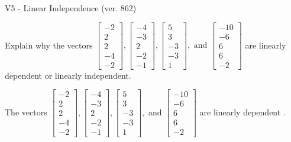 \begin{exercise}
  \begin{exerciseTitle}V5 - Linear Independence (ver. 862)\end{exerciseTitle}
  \begin{exerciseStatement}
    Explain why the vectors \(\left[\begin{array}{r}
-2 \\
2 \\
2 \\
-4 \\
-2
\end{array}\right] , \left[\begin{array}{r}
-4 \\
-3 \\
2 \\
-2 \\
-1
\end{array}\right] , \left[\begin{array}{r}
5 \\
3 \\
-3 \\
-3 \\
1
\end{array}\right] , \text{ and } \left[\begin{array}{r}
-10 \\
-6 \\
6 \\
6 \\
-2
\end{array}\right]\) are linearly dependent or linearly independent.	


  \end{exerciseStatement}
  \begin{exerciseAnswer}
   The vectors \(\left[\begin{array}{r}
-2 \\
2 \\
2 \\
-4 \\
-2
\end{array}\right] , \left[\begin{array}{r}
-4 \\
-3 \\
2 \\
-2 \\
-1
\end{array}\right] , \left[\begin{array}{r}
5 \\
3 \\
-3 \\
-3 \\
1
\end{array}\right] , \text{ and } \left[\begin{array}{r}
-10 \\
-6 \\
6 \\
6 \\
-2
\end{array}\right]\) are 
  	 linearly dependent  .
  


  \end{exerciseAnswer}
\end{exercise}